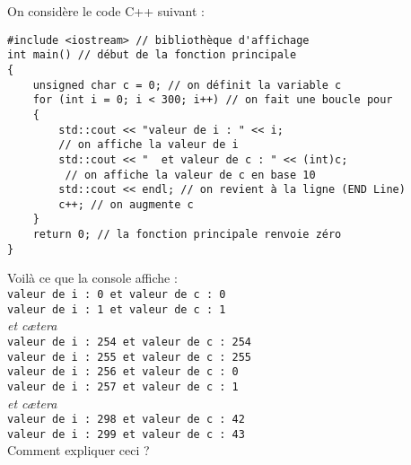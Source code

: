 \documentclass[a4paper,12pt,french]{book}
\begin{document}
\begin{exercice}
	On considère le code \textsc{C++} suivant :
\begin{verbatim}
#include <iostream> // bibliothèque d'affichage
int main() // début de la fonction principale
{
    unsigned char c = 0; // on définit la variable c
    for (int i = 0; i < 300; i++) // on fait une boucle pour
    {
        std::cout << "valeur de i : " << i;
        // on affiche la valeur de i
        std::cout << "  et valeur de c : " << (int)c;
         // on affiche la valeur de c en base 10
        std::cout << endl; // on revient à la ligne (END Line)
        c++; // on augmente c
    }
    return 0; // la fonction principale renvoie zéro
}
\end{verbatim}

Voilà ce que la console affiche :\\

\texttt{valeur de i : 0  et valeur de c : 0}\\
\texttt{valeur de i : 1  et valeur de c : 1}\\
\textit{et c\ae tera}\\
\texttt{valeur de i : 254  et valeur de c : 254}\\
\texttt{valeur de i : 255  et valeur de c : 255}\\
\texttt{valeur de i : 256  et valeur de c : 0}\\
\texttt{valeur de i : 257  et valeur de c : 1}\\
\textit{et c\ae tera}\\
\texttt{valeur de i : 298  et valeur de c : 42}\\
\texttt{valeur de i : 299  et valeur de c : 43}\\

Comment expliquer ceci ?

\end{exercice}
\end{document}
